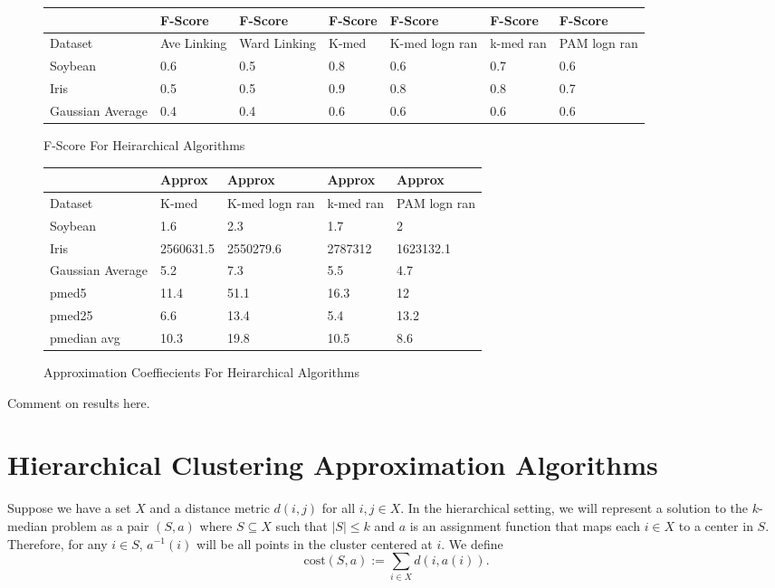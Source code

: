 \documentclass{article}
\begin{document}
\begin{figure*}[h]
\small
\begin{tabular}{ | l | l | l | l | l | l | l | }
\hline
	   & F-Score & F-Score & F-Score & F-Score & F-Score & F-Score \\ \hline
	Dataset & Ave Linking & Ward Linking & K-med & K-med logn ran & k-med ran & PAM logn ran \\ \hline
	Soybean & 0.6 & 0.5 & 0.8 & 0.6 & 0.7 & 0.6 \\ 
	Iris & 0.5 & 0.5 & 0.9 & 0.8 & 0.8 & 0.7 \\ 
	Gaussian Average & 0.4 & 0.4 & 0.6 & 0.6 & 0.6 & 0.6 \\ \hline
\end{tabular}






\caption{F-Score For Heirarchical Algorithms}
\end{figure*}

\begin{figure*}[h]
\small
\begin{tabular}{ | l | l | l | l | l | }
\hline
	   & Approx & Approx & Approx & Approx \\ \hline
	Dataset & K-med & K-med logn ran & k-med ran & PAM logn ran \\ \hline
	Soybean & 1.6 & 2.3 & 1.7 & 2 \\ 
	Iris & 2560631.5 & 2550279.6 & 2787312 & 1623132.1 \\ 
	Gaussian Average & 5.2 & 7.3 & 5.5 & 4.7 \\ 
	pmed5 & 11.4 & 51.1 & 16.3 & 12 \\ 
	pmed25 & 6.6 & 13.4 & 5.4 & 13.2 \\ 
	pmedian avg & 10.3 & 19.8 & 10.5 & 8.6 \\ \hline
\end{tabular}




\caption{Approximation Coeffiecients For Heirarchical Algorithms}
\end{figure*}



Comment on results here.

\section{Hierarchical Clustering Approximation Algorithms}
Suppose we have a set $X$ and a distance metric $d(i,j)$ for all $i,j \in X$. In the hierarchical setting, we will represent a solution to the $k$-median problem as a pair $(S, a)$ where $S \subseteq X$ such that $|S| \leq k$ and $a$ is an assignment function that maps each $i \in X$ to a center in $S$. Therefore, for any $i \in S$, $a^{-1}(i)$ will be all points in the cluster centered at $i$. We define
\[ \mathrm{cost}(S,a) := \sum_{i \in X} d(i, a(i)) . \]
\end{document}
